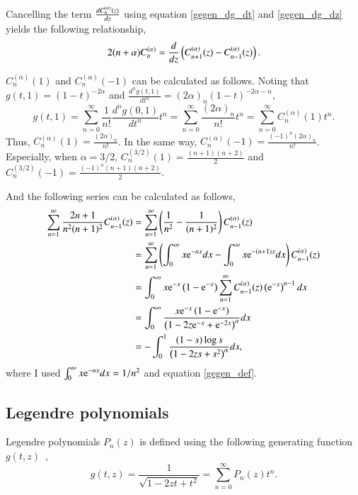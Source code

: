 \documentclass{article}
\begin{document}
Cancelling the term $\frac{d {C^{(\alpha)}_{n} (z)}}{d {z}}$ using equation \eqref{gegen_dg_dt} and \eqref{gegen_dg_dz} yields the following relationship,
\begin{equation}
 2(n+\alpha) C^{(\alpha)}_{n} = \frac{d {}}{d {z}} \left( C^{(\alpha)}_{n+1} (z) - C^{(\alpha)}_{n-1} (z) \right).\label{gegen_diff}
\end{equation}

$C^{(\alpha)}_n (1)$ and $C^{(\alpha)}_n (-1)$ can be calculated as follows.
Noting that $g(t,1) = (1-t)^{-2\alpha}$ and $\frac{d^n g(t,1)}{dt^n} = (2\alpha)_n (1-t)^{-2\alpha - n}$,
\begin{equation}
 g(t,1) = \sum_{n=0}^{\infty} \frac{1}{n!} \frac{d^n g(0,1)}{dt^n} t^n = \sum_{n=0}^{\infty} \frac{(2\alpha)_n}{n!} t^n = \sum_{n=0}^{\infty} C^{(\alpha)}_n (1) t^n.
\end{equation}
Thus, $C^{(\alpha)}_n (1) = \frac{(2\alpha)_n}{n!}$. In the same way, $C^{(\alpha)}_n (-1) = \frac{(-1)^{n} (2\alpha)_n}{n!}$.
Especially, when $\alpha=3/2$,
$C^{(3/2)}_n (1) = \frac{(n+1)(n+2)}{2}$ and $C^{(3/2)}_n (-1) = \frac{(-1)^n (n+1)(n+2)}{2}$.

And the following series can be calculated as follows,
\begin{align}
 \sum_{n=1}^{\infty}\frac{2n+1}{n^2(n+1)^2} C^{(\alpha)}_{n-1} (z) & = \sum_{n=1}^{\infty} \left( \frac{1}{n^2} - \frac{1}{(n+1)^2} \right) C^{(\alpha)}_{n-1} (z)\\
 & = \sum_{n=1}^{\infty} \left( \int_{0}^{\infty} x \mathrm{e}^{-nx} dx - \int_{0}^{\infty} x \mathrm{e}^{-(n+1)x} dx \right) C^{(\alpha)}_{n-1} (z)\\
 & = \int_{0}^{\infty} x \mathrm{e}^{-x} \left( 1 - \mathrm{e}^{-x} \right) \sum_{n=1}^{\infty} C^{(\alpha)}_{n-1} (z) \left( \mathrm{e}^{-x} \right)^{n-1} dx\\
 & = \int_{0}^{\infty} \frac{x \mathrm{e}^{-x} \left( 1 - \mathrm{e}^{-x} \right)}{ \left(1 -2z\mathrm{e}^{-x} + \mathrm{e}^{-2x}\right)^{\alpha}} dx\\
 & = - \int_{0}^{1} \frac{(1 - s) \log s}{ \left(1 -2zs + s^2 \right)^{\alpha}} ds,\label{gegen_int}
\end{align}
where I used $\int_{0}^{\infty} x \mathrm{e}^{-nx} dx = 1/n^2$ and equation \eqref{gegen_def}.

\subsection{Legendre polynomials}
Legendre polynomials $P_n(z)$ is defined using the following generating function $g(t,z)$~\cite{olver2010nist},
\begin{equation}
 g(t,z) = \frac{1}{\sqrt{1 - 2zt + t^2}} = \sum_{n=0}^{\infty} P_n(z) t^n.
\end{equation}
\end{document}
